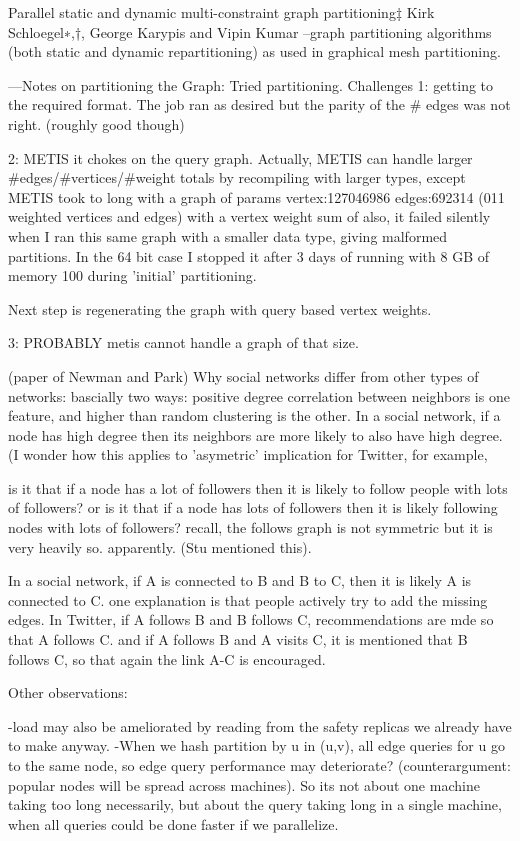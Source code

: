 \documentclass{article}
\begin{document}
Parallel static and dynamic
multi-constraint graph
partitioning‡
Kirk Schloegel∗,†, George Karypis and Vipin Kumar
--graph partitioning algorithms (both static and dynamic repartitioning) as used in graphical mesh partitioning.

---Notes on partitioning the Graph:
Tried partitioning. Challenges 
1: getting to the required format. The job ran as desired but the parity of the # edges was not right. (roughly good though)

2: METIS it chokes on the query graph.
Actually, METIS can handle larger #edges/#vertices/#weight totals by recompiling with larger types, 
except METIS took to long with a graph of params vertex:127046986  edges:692314 (011 weighted vertices and edges)  with a vertex weight sum of
also, it failed silently when I ran this same graph with a smaller data type, giving malformed partitions.
In the 64 bit case I stopped it after 3 days of running with 8 GB of memory 100%
during 'initial' partitioning.

Next step is regenerating the graph with query based vertex weights.


3: PROBABLY metis cannot handle a graph of that size.


(paper of Newman and Park) Why social networks differ from other types of networks:
bascially two ways: positive degree correlation between neighbors is one feature, and higher than random clustering is the other.
In a social network, if a node has high degree then its neighbors are more likely to also have  high degree. 
(I wonder how this applies to 'asymetric' implication for Twitter, for example, 

is it that if a node has a lot of followers then it is likely to follow people with lots of followers?
or is it that if a node has lots of followers then it is likely following nodes with lots of followers?
recall, the follows graph is not symmetric but it is very heavily so. apparently. (Stu mentioned this).
 
In a social network, if A is connected to B and B to C, then it is likely A is connected to C. one explanation is
that people actively try to add the missing edges.  In Twitter, if A follows B and B follows C, recommendations are mde
so that A follows C. and if A follows B and A visits C, it is mentioned that B follows C, so that again the link A-C is encouraged.


Other observations:

-load may also be ameliorated by reading from the safety replicas we already have to make anyway.
-When we hash partition by u in (u,v), all edge queries for  u go to the same node, so edge query performance may deteriorate?
(counterargument: popular nodes will be spread across machines). So its not about one machine taking too long necessarily, but
about the query taking long in a single machine, when all queries could be done faster if we parallelize.
\end{document}

